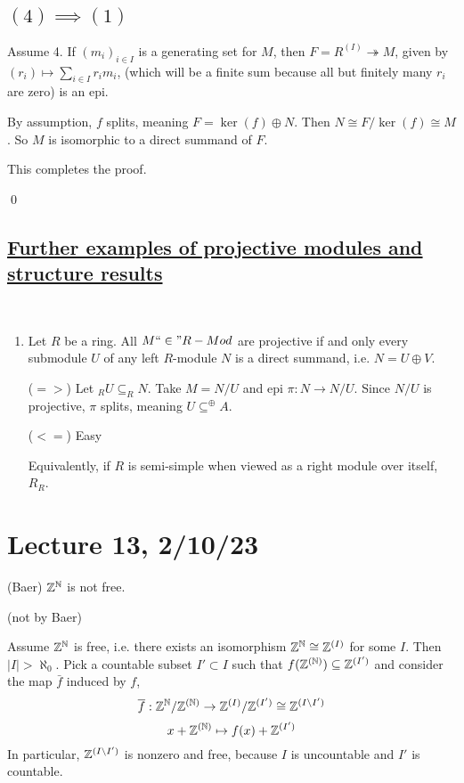 \documentclass[x11names,reqno,14pt]{extarticle}
\newcommand{\fin}{``\in"}
\newcommand{\onto}{\twoheadrightarrow}
\begin{document}
\subsection*{$(4)\implies(1)$}

Assume 4. If $(m_i)_{i\in I}$ is a generating set for $M$, then $F = R^{(I)}\onto M$, given by $(r_i)\mapsto\sum_{i\in I}r_im_i$, (which will be a finite sum because all but finitely many $r_i$ are zero) is an epi. 

By assumption, $f$ splits, meaning $F = \ker(f)\oplus N$. Then $N \cong F/\ker(f)\cong M$. So $M$ is isomorphic to a direct summand of $F$. 

This completes the proof.

\qed

\subsection*{\underline{Further examples of projective modules and structure results}}

\exm\,

\begin{enumerate}

\item Let $R$ be a ring. All $M \fin R-Mod$ are projective if and only every submodule $U$ of any left $R$-module $N$ is a direct summand, i.e. $N = U \oplus V$. 

($=>$)
Let $_RU\subseteq _RN$. Take $M = N/U$ and epi $\pi:N\to N/U$. Since $N/U$ is projective, $\pi$ splits, meaning $U \subseteq^{\oplus}A$. 

($<=$)
Easy

Equivalently, if $R$ is semi-simple when viewed as a right module over itself, $R_R$.

\end{enumerate}

\section*{Lecture 13, 2/10/23}

\prop (Baer) $\mathbb{Z}^{\mathbb{N}}$ is not free. 

\proof (not by Baer) 

Assume $\mathbb{Z}^{\mathbb{N}}$ is free, i.e. there exists an isomorphism $\mathbb{Z}^{\mathbb{N}}\cong\mathbb{Z}^{(I)}$ for some $I$. Then $|I|>\aleph_0$. Pick a countable subset $I'\subset I$ such that $f(\mathbb{Z}^{(\mathbb{N})}) \subseteq \mathbb{Z}^{(I')}$ and consider the map $\bar{f}$ induced by $f$, 
\[
\overline{f}:\mathbb{Z}^{\mathbb{N}}/\mathbb{Z}^{(\mathbb{N})} \to \mathbb{Z}^{(I)}/\mathbb{Z}^{(I')}\cong\mathbb{Z}^{(I\setminus I')}
\]
\[
x + \mathbb{Z}^{(\mathbb{N})} \mapsto f(x) + \mathbb{Z}^{(I')}
\]
In particular, $\mathbb{Z}^{(I\setminus I')}$ is nonzero and free, because $I$ is uncountable and $I'$ is countable. 
\end{document}
